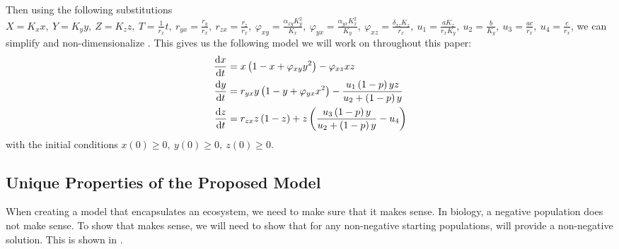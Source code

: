 Then using the following substitutions $X=K_xx,\ Y=K_yy,\ Z=K_zz,\ T=\frac{1}{r_x}t,\ r_{yx}=\frac{r_y}{r_x},\ r_{zx}=\frac{r_z}{r_x},\ \varphi_{xy}=\frac{\alpha_{xy}K_y^2}{K_x},\ \varphi_{yx}=\frac{\alpha_{yx}K_x^2}{K_y},\ \varphi_{xz}=\frac{\delta_{xz}K_z}{r_x},\ u_1=\frac{aK_z}{r_xK_y},\ u_2=\frac{b}{K_y},\ u_3=\frac{ac}{r_x},\ u_4=\frac{e}{r_x}$, we can simplify and non-dimensionalize .
This gives us the following model we will work on throughout this paper:
\begin{subequations}\label{model:rayla-ephraim}
    \begin{align}
        \diff[]{x}{t} &= x\left(1-x+\varphi_{xy}y^2\right)-\varphi_{xz}xz
        \label{eq:rayla-ephraim-x}\\
        \diff[]{y}{t} &= r_{yx}y\left(1-y+\varphi_{yx}x^2\right)-\frac{u_1\left(1-p\right)yz}{u_2+\left(1-p\right)y}
        \label{eq:rayla-ephraim-y}\\
        \diff[]{z}{t} &= r_{zx}z\left(1-z\right)+z\left(\frac{u_3\left(1-p\right)y}{u_2+\left(1-p\right)y}-u_4\right)
        \label{eq:rayla-ephraim-z}
    \end{align}
\end{subequations}
with the initial conditions $x(0)\geq 0,\ y(0)\geq 0,\ z(0)\geq 0$.

\subsection{Unique Properties of the Proposed Model}\label{subsec:unique-properties-of-the-proposed-model}
When creating a model that encapsulates an ecosystem, we need to make sure that it makes sense.
In biology, a negative population does not make sense.
To show that  makes sense, we will need to show that for any non-negative starting populations,  will provide a non-negative solution.
This is shown in .

